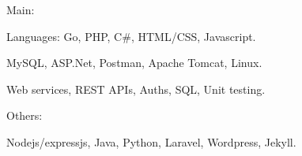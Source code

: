 \begin{cventries}

    
\cventry
    {Main:}
    {}
    {}
    {}
    {
        \begin{cvitems}
            \item Languages: Go, PHP, C\#, HTML/CSS, Javascript. 
            \item MySQL, ASP.Net, Postman, Apache Tomcat, Linux.
            \item Web services, REST APIs, Auths, SQL, Unit testing.
        \end{cvitems}
    }


\cventry
    {Others:}
    {}
    {}
    {}
    {
        \begin{cvitems}
            \item Nodejs/expressjs, Java, Python, Laravel, Wordpress, Jekyll.
        \end{cvitems}
    }
\end{cventries}
